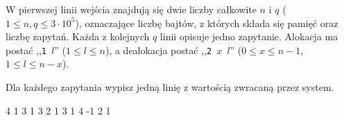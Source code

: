 
W pierwszej linii wejścia znajdują się dwie liczby całkowite $n$ i $q$ ($1 \le n, q \le 3 \cdot 10^5$),
	oznaczające liczbę bajtów, z których składa się pamięć oraz liczbę zapytań.
Każda z kolejnych $q$ linii opisuje jedno zapytanie.
Alokacja ma postać ,,\texttt{1 $l$}'' ($1 \le l \le n$), a dealokacja postać ,,\texttt{2 $x$ $l$}''
	($0 \le x \le n -1$, $1 \le l \le n - x$).


Dla każdego zapytania wypisz jedną linię z wartością zwracaną przez system.



 4
1 3
1 3
2 1 3
1 4
-1
2
1
\sampleEND



